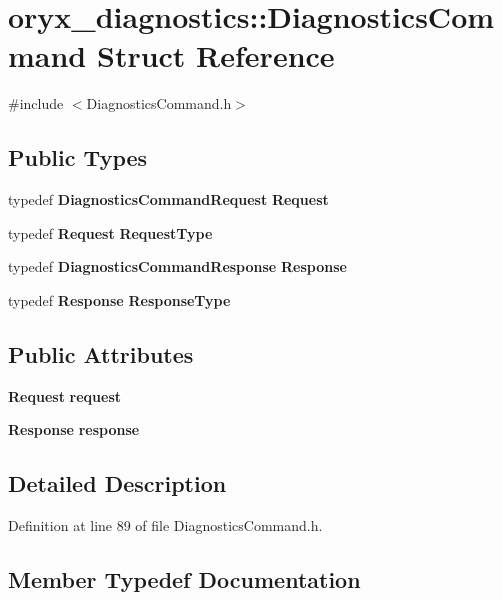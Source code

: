 \section{oryx\-\_\-diagnostics\-:\-:\-Diagnostics\-Command \-Struct \-Reference}
\label{structoryx__diagnostics_1_1DiagnosticsCommand}


{\ttfamily \#include $<$\-Diagnostics\-Command.\-h$>$}

\subsection*{\-Public \-Types}
\begin{DoxyCompactItemize}
\item 
typedef {\bf \-Diagnostics\-Command\-Request} {\bf \-Request}
\item 
typedef {\bf \-Request} {\bf \-Request\-Type}
\item 
typedef {\bf \-Diagnostics\-Command\-Response} {\bf \-Response}
\item 
typedef {\bf \-Response} {\bf \-Response\-Type}
\end{DoxyCompactItemize}
\subsection*{\-Public \-Attributes}
\begin{DoxyCompactItemize}
\item 
{\bf \-Request} {\bf request}
\item 
{\bf \-Response} {\bf response}
\end{DoxyCompactItemize}


\subsection{\-Detailed \-Description}


\-Definition at line 89 of file \-Diagnostics\-Command.\-h.



\subsection{\-Member \-Typedef \-Documentation}
